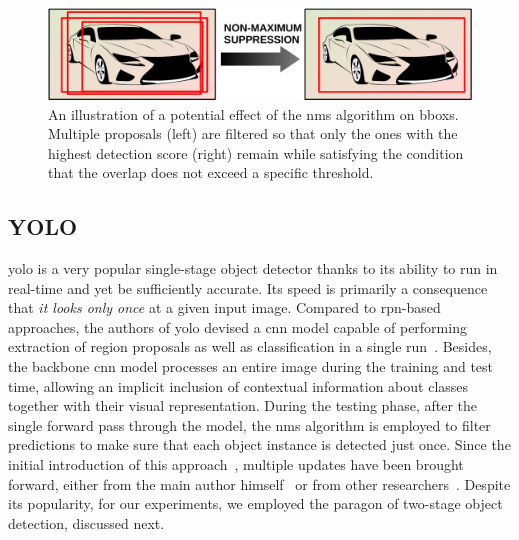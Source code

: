 \begin{figure}[t]
    \centerline{\includegraphics[width=0.6\linewidth]{figures/theoretical_foundations/non_maximum_suppression.pdf}}
    \caption[\gls{nms} visualization]{An illustration of a potential effect of the \gls{nms} algorithm on \glspl{bbox}. Multiple proposals (left) are filtered so that only the ones with the highest detection score (right) remain while satisfying the condition that the overlap does not exceed a specific threshold.}
    \label{fig:NonMaximumSuppression}
\end{figure}

\subsection{YOLO}
\label{ssec:YouLookOnlyOnce}

\gls{yolo} is a very popular single-stage object detector thanks to its ability to run in real-time and yet be sufficiently accurate. Its speed is primarily a consequence that \emph{it looks only once} at a given input image. Compared to \gls{rpn}-based approaches, the authors of \gls{yolo} devised a \gls{cnn} model capable of performing extraction of region proposals as well as classification in a single run~\cite{redmon2016yolo}. Besides, the backbone \gls{cnn} model processes an entire image during the training and test time, allowing an implicit inclusion of contextual information about classes together with their visual representation. During the testing phase, after the single forward pass through the model, the \gls{nms} algorithm is employed to filter predictions to make sure that each object instance is detected just once. Since the initial introduction of this approach~\cite{redmon2016yolo}, multiple updates have been brought forward, either from the main author himself~\cite{redmon2017yolo9000, redmon2018yolov3} or from other researchers~\cite{wang2020yolov4, wong2019yolonano}. Despite its popularity, for our experiments, we employed the paragon of two-stage object detection, discussed next.

